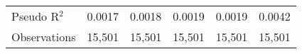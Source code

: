 {\begin{tabular}{l*{5}{c}}
Pseudo R$ ^2 $  &   0.0017         &   0.0018         &   0.0019         &   0.0019         &   0.0042         \\
Observations    &   15,501         &   15,501         &   15,501         &   15,501         &   15,501         \\
\bottomrule
\end{tabular}
}
